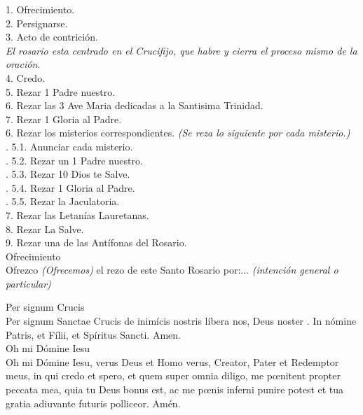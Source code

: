 \documentclass[letterpaper, landscape, 10pt, twocolumn]{article}
\begin{document}
  \noindent
  \normalsize 1. Ofrecimiento.\\
  2. Persignarse.\\
  3. Acto de contrición.\\
  {\color{red}\textit{El rosario esta centrado en el Crucifijo, que habre y cierra el proceso mismo de la oración.}}\\
  4. Credo.\\
  5. Rezar 1 Padre nuestro.\\
  6. Rezar las 3 Ave Maria dedicadas a la Santisima Trinidad.\\
  7. Rezar 1 Gloria al Padre.\\
  6. Rezar los misterios correspondientes. {\color{red} \textit{(Se reza lo siguiente por cada misterio.)}}\\
  .\hspace{0.75cm} 5.1. Anunciar cada misterio.\\
  .\hspace{0.75cm} 5.2. Rezar un 1 Padre nuestro.\\
  .\hspace{0.75cm} 5.3. Rezar 10 Dios te Salve.\\
  .\hspace{0.75cm} 5.4. Rezar 1 Gloria al Padre.\\
  .\hspace{0.75cm} 5.5. Rezar la Jaculatoria.\\
  7. Rezar las Letanías Lauretanas.\\
  8. Rezar La Salve.\\
  9. Rezar una de las Antífonas del Rosario.\\

  \Large {\color{red} Ofrecimiento}\\
  \normalsize {\color{red} O}frezco{\color{red} \textit{(Ofrecemos)}} el rezo de este Santo Rosario por:... {\color{red} \textit{(intención general o particular)}}\\
  \clearpage

  \thispagestyle{empty}
  \Large {\color{red} Per signum Crucis}\\
  \normalsize {\color{red} P}er signum Sanctae Crucis {\color{red} \large \maltese} de inimícis nostris {\color{red} \large \maltese} líbera nos, Deus noster {\color{red} \large \maltese}. {\color{red} I}n nómine Patris, et Fílii, {\color{red} \large \maltese} et Spíritus Sancti.{\color{red} A}men.\\

  \Large {\color{red} Oh mi Dómine Iesu}\\
  \normalsize {\color{red} O}h mi Dómine Iesu, verus Deus et Homo verus, Creator, Pater et Redemptor meus, in qui credo et spero, et quem super omnia diligo, me pœnitent propter peccata mea, quia tu Deus bonus est, ac me pœnis inferni punire potest et tua gratia adiuvante futuris polliceor. {\color{red} A}mén.\\
\end{document}
